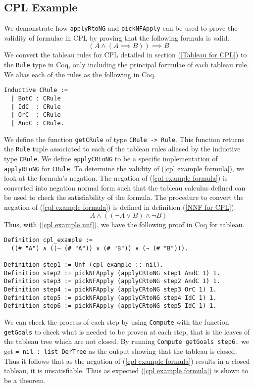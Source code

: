 \documentclass{llncs}
\begin{document}
\subsection{CPL Example}
%
We demonstrate how \verb+applyRtoNG+ and \verb+pickNFApply+ can be used to
prove the validity of formulae in CPL by proving that the following formula is
valid.
%
\begin{equation}
(A \wedge (A \implies B)) \implies B
\label{cpl example formula}
\end{equation}
%
We convert the tableau rules for CPL detailed in section (\ref{Tableau for
CPL}) to the \verb+Rule+ type in Coq, only including the principal formulae of
each tableau rule. We alias each of the rules as the following in Coq.
%
\begin{verbatim}
Inductive CRule := 
  | BotC : CRule
  | IdC  : CRule
  | OrC  : CRule
  | AndC : CRule.
\end{verbatim}
%
We define the function \verb+getCRule+ of type \verb+CRule -> Rule+. This
function returns the \verb+Rule+ tuple associated to each of the tableau rules
aliased by the inductive type \verb+CRule+. We define \verb+applyCRtoNG+ to be
a specific implementation of \verb+applyRtoNG+ for \verb+CRule+. To determine
the validity of (\ref{cpl example formula}), we look at the formula's negation.
The negation of (\ref{cpl example formula}) is converted into negation normal
form such that the tableau calculus defined can be used to check the
satisfiability of the formula. The procedure to convert the negation of
(\ref{cpl example formula}) is defined in definition (\ref{NNF for CPL}).
%
\begin{equation}
A \wedge ((\neg A \vee B) \wedge \neg B)
\label{cpl example nnf}
\end{equation}
%
Thus, with (\ref{cpl example nnf}), we have the following proof in Coq for
tableau.
%
\begin{verbatim}
Definition cpl_example :=
  ((# "A") ∧ ((¬ (# "A")) ∨ (# "B")) ∧ (¬ (# "B"))).

Definition step1 := Unf (cpl_example :: nil).
Definition step2 := pickNFApply (applyCRtoNG step1 AndC 1) 1.
Definition step3 := pickNFApply (applyCRtoNG step2 AndC 1) 1.
Definition step4 := pickNFApply (applyCRtoNG step3 OrC 1) 1.
Definition step5 := pickNFApply (applyCRtoNG step4 IdC 1) 1.
Definition step6 := pickNFApply (applyCRtoNG step5 IdC 1) 1.
\end{verbatim}
%
We can check the process of each step by using \verb+Compute+ with the function
\verb+getGoals+ to check what is needed to be proven at each step, that is the
leaves of the tableau tree which are not closed.
By running \verb+Compute getGoals step6.+ we get \verb+= nil : list DerTree+ as
the output showing that the tableau is closed. Thus it follows that as the
negation of (\ref{cpl example formula}) results in a closed tableau, it is 
unsatisfiable. Thus as expected (\ref{cpl example formula}) is shown to be a
theorem.
%
\end{document}

